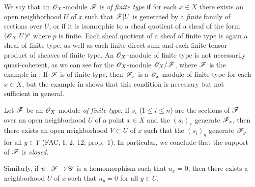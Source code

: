 \begin{env}[5.2.1]
\label{0.5.2.1}
We say that an $\mathscr{O}_X$-module $\mathscr{F}$ is \emph{of finite type} if for each $x\in X$ there exists an open neighborhood $U$ of $x$ such that $\mathscr{F}|U$ is generated by a \emph{finite} family of sections over $U$, or if it is isomorphic to a sheaf quotient of a sheaf of the form $(\mathscr{O}_X|U)^p$ where $p$ is finite.
Each sheaf quotient of a sheaf of finite type is again a sheaf of finite type, as well as each finite direct sum and each finite tensor product of sheaves of finite type.
An $\mathscr{O}_X$-module of finite type is not necessarily quasi-coherent, as we can see for the $\mathscr{O}_X$-module $\mathscr{O}_X/\mathscr{F}$, where $\mathscr{F}$ is the example in .
If $\mathscr{F}$ is of finite type, then $\mathscr{F}_x$ is a $\mathscr{O}_x$-module of finite type for each $x\in X$, but the example in  shows that this condition is necessary but not sufficient in general.
\end{env}

\begin{env}[5.2.2]
\label{0.5.2.2}
Let $\mathscr{F}$ be an $\mathscr{O}_X$-module \emph{of finite type}.
If $s_i$ ($1\leqslant i\leqslant n$) are the sections of $\mathscr{F}$ over an open neighborhood $U$ of a point $x\in X$ and the $(s_i)_x$ generate $\mathscr{F}_x$, then there exists an open neighborhood $V\subset U$ of $x$ such that the $(s_i)_y$ generate $\mathscr{F}_y$ for all $y\in Y$ (FAC, I, 2, 12, prop.~1).
In particular, we conclude that the support of $\mathscr{F}$ is \emph{closed}.

Similarly, if $u:\sh{F}\to\sh{G}$ is a homomorphism such that $u_x=0$, then there exists a neighborhood $U$ of $x$ such that $u_y=0$ for all $y\in U$.
\end{env}

